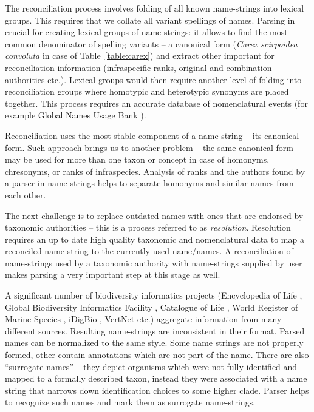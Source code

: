 \documentclass{bmcart}
\begin{document}
The reconciliation process involves folding of all known name-strings into
lexical groups. This requires that we collate all variant spellings of names.
Parsing in crucial for creating lexical groups of name-strings: it allows to
find the most common denominator of spelling variants -- a canonical form
(\textit{Carex scirpoidea convoluta} in case of Table~\ref{table:carex}) and
extract other important for reconciliation  information (infraspecific ranks,
original and combination authorities etc.). Lexical groups would then require
another level of folding into reconciliation groups where homotypic and
heterotypic synonyms are placed together. This process requires an accurate
database of nomenclatural events (for example Global Names Usage Bank
\cite{Pyle2003}).

Reconciliation uses the most stable component of a name-string -- its canonical
form. Such approach brings us to another problem -- the same canonical form may
be used for more than one taxon or concept in case of homonyms, chresonyms, or
ranks of infraspecies. Analysis of ranks and the authors found by a
parser in name-strings helps to separate homonyms and similar names from each
other.

The next challenge is to replace outdated names with ones that are endorsed by
taxonomic authorities -- this is a process referred to as \textit{resolution}.
Resolution requires an up to date high quality taxonomic and nomenclatural data
to map a reconciled name-string to the currently used name/names. A
reconciliation of name-strings used by a taxonomic authority with name-strings
supplied by user makes parsing a very important step at this stage as well.

A significant number of biodiversity informatics projects (Encyclopedia of Life
\cite{eol}, Global Biodiversity Informatics Facility \cite{gbif}, Catalogue of
Life \cite{col}, World Register of Marine Species \cite{worms}, iDigBio
\cite{idigbio}, VertNet \cite{vertnet} etc.) aggregate information from many
different sources.  Resulting name-strings are inconsistent in their format.
Parsed names can be normalized to the same style. Some name strings are not
properly formed, other contain annotations which are not part of the name.
There are also “surrogate names” -- they depict organisms which were not fully
identified and mapped to a formally described taxon, instead they were
associated with a name string that narrows down identification choices to some
higher clade. Parser helps to recognize such names and mark them as surrogate
name-strings.
\end{document}
